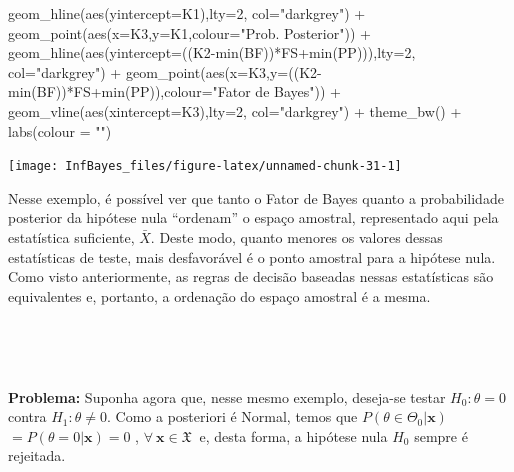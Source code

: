 \documentclass[
]{book}
\newenvironment{Shaded}{\begin{snugshade}}{\end{snugshade}}
\newcommand{\AttributeTok}[1]{\textcolor[rgb]{0.77,0.63,0.00}{#1}}
\newcommand{\DecValTok}[1]{\textcolor[rgb]{0.00,0.00,0.81}{#1}}
\newcommand{\FunctionTok}[1]{\textcolor[rgb]{0.00,0.00,0.00}{#1}}
\newcommand{\NormalTok}[1]{#1}
\newcommand{\SpecialCharTok}[1]{\textcolor[rgb]{0.00,0.00,0.00}{#1}}
\newcommand{\StringTok}[1]{\textcolor[rgb]{0.31,0.60,0.02}{#1}}
\begin{document}
\begin{Shaded}
\begin{Highlighting}[]
    \FunctionTok{geom\_hline}\NormalTok{(}\FunctionTok{aes}\NormalTok{(}\AttributeTok{yintercept=}\NormalTok{K1),}\AttributeTok{lty=}\DecValTok{2}\NormalTok{, }\AttributeTok{col=}\StringTok{"darkgrey"}\NormalTok{) }\SpecialCharTok{+}
    \FunctionTok{geom\_point}\NormalTok{(}\FunctionTok{aes}\NormalTok{(}\AttributeTok{x=}\NormalTok{K3,}\AttributeTok{y=}\NormalTok{K1,}\AttributeTok{colour=}\StringTok{"Prob. Posterior"}\NormalTok{)) }\SpecialCharTok{+}
    \FunctionTok{geom\_hline}\NormalTok{(}\FunctionTok{aes}\NormalTok{(}\AttributeTok{yintercept=}\NormalTok{((K2}\SpecialCharTok{{-}}\FunctionTok{min}\NormalTok{(BF))}\SpecialCharTok{*}\NormalTok{FS}\SpecialCharTok{+}\FunctionTok{min}\NormalTok{(PP))),}\AttributeTok{lty=}\DecValTok{2}\NormalTok{, }\AttributeTok{col=}\StringTok{"darkgrey"}\NormalTok{) }\SpecialCharTok{+}
    \FunctionTok{geom\_point}\NormalTok{(}\FunctionTok{aes}\NormalTok{(}\AttributeTok{x=}\NormalTok{K3,}\AttributeTok{y=}\NormalTok{((K2}\SpecialCharTok{{-}}\FunctionTok{min}\NormalTok{(BF))}\SpecialCharTok{*}\NormalTok{FS}\SpecialCharTok{+}\FunctionTok{min}\NormalTok{(PP)),}\AttributeTok{colour=}\StringTok{"Fator de Bayes"}\NormalTok{)) }\SpecialCharTok{+}
    \FunctionTok{geom\_vline}\NormalTok{(}\FunctionTok{aes}\NormalTok{(}\AttributeTok{xintercept=}\NormalTok{K3),}\AttributeTok{lty=}\DecValTok{2}\NormalTok{, }\AttributeTok{col=}\StringTok{"darkgrey"}\NormalTok{) }\SpecialCharTok{+}
    \FunctionTok{theme\_bw}\NormalTok{() }\SpecialCharTok{+} \FunctionTok{labs}\NormalTok{(}\AttributeTok{colour =} \StringTok{""}\NormalTok{)}
\end{Highlighting}
\end{Shaded}

\begin{center}\texttt{[image: InfBayes\_files/figure-latex/unnamed-chunk-31-1]} \end{center}

Nesse exemplo, é possível ver que tanto o Fator de Bayes quanto a probabilidade posterior da hipótese nula ``ordenam'' o espaço amostral, representado aqui pela estatística suficiente, \(\bar{X}\). Deste modo, quanto menores os valores dessas estatísticas de teste, mais desfavorável é o ponto amostral para a hipótese nula. Como visto anteriormente, as regras de decisão baseadas nessas estatísticas são equivalentes e, portanto, a ordenação do espaço amostral é a mesma.

\(~\)

\(~\)

\textbf{Problema:} Suponha agora que, nesse mesmo exemplo, deseja-se testar \(H_0:\theta=0\) contra \(H_1: \theta\neq 0\). Como a posteriori é Normal, temos que \(P(\theta \in \Theta_0|\boldsymbol x)\) \(=P(\theta=0|\boldsymbol x)=0\) , \(\forall~ \boldsymbol x\in \mathfrak{X}~\) e, desta forma, a hipótese nula \(H_0\) sempre é rejeitada.
\end{document}
